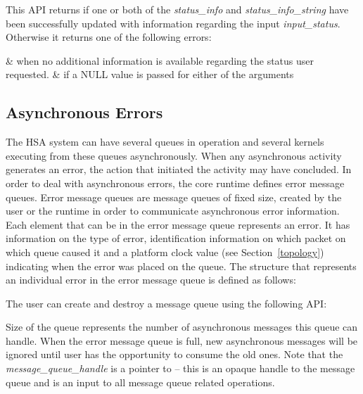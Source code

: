 

This API returns  if one or both of the
{\itshape status\_info} and {\itshape status\_info\_string} have been 
successfully updated with information regarding the input
{\itshape input\_status}. Otherwise it returns one of the following errors:

\begin{easylist}
&  when no additional information is
available regarding the status user requested. 
&  if a NULL value is
passed for either of the arguments
\end{easylist}

\begin{DIFnomarkup}
\hypertarget{asyncerror}{}\subsection{Asynchronous Errors }\label{asyncerror}
\end{DIFnomarkup}

The HSA system can have several queues in operation and
several kernels executing from these queues asynchronously.
When any asynchronous activity generates an error, the action that
initiated the activity may have concluded. In order to deal with
asynchronous errors, the core runtime defines error message queues.
Error message queues are message queues of fixed size, created by the user
or the runtime in order to communicate asynchronous error
information. Each element that can be in the error message queue
represents an error. It has information on the type of error,
identification information on which packet on which queue caused it
and a platform clock value (see Section~\ref{topology}) indicating
when the error was placed on the queue. The structure that
represents an individual error in the error message queue is defined
as follows:



The user can create and destroy a message queue using the following API:



Size of the queue represents the number of asynchronous messages
this queue can handle. When the error message queue is full, new
asynchronous messages will be ignored until user has the opportunity
to consume the old ones. Note that the
{\itshape message\_queue\_handle} is a pointer to
 -- this is an opaque
handle to the message queue and is an input to all message queue
related operations.

